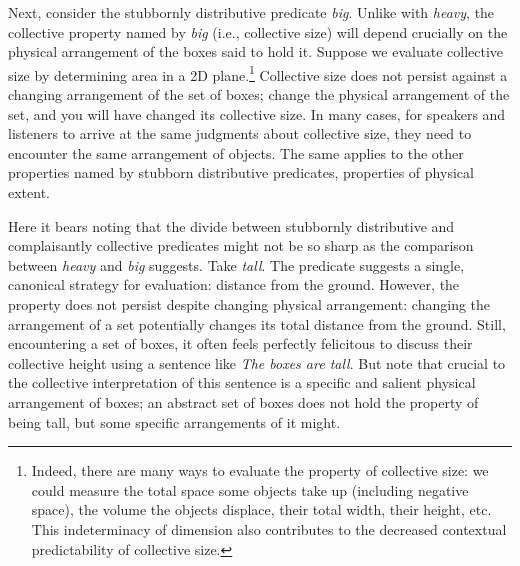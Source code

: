 \documentclass[linguex]{sp}
\begin{document}
Next, consider the stubbornly distributive predicate \emph{big}. Unlike with \emph{heavy}, the collective property named by \emph{big} (i.e., collective size) will depend crucially on the physical arrangement of the boxes said to hold it. Suppose we evaluate collective size by determining area in a 2D plane.\footnote{Indeed, there are many ways to evaluate the property of collective size: we could measure the total space some objects take up (including negative space), the volume the objects displace, their total width, their height, etc. This indeterminacy of dimension also contributes to the decreased contextual predictability of collective size.} Collective size does not persist against a changing arrangement of the set of boxes; change the physical arrangement of the set, and you will have changed its collective size. In many cases, for speakers and listeners to arrive at the same judgments about collective size, they need to encounter the same arrangement of objects. The same applies to the other properties named by stubborn distributive predicates, properties of physical extent.

Here it bears noting that the divide between stubbornly distributive and complaisantly collective predicates might not be so sharp as the comparison between \emph{heavy} and \emph{big} suggests. Take \emph{tall}. The predicate suggests a single, canonical strategy for evaluation: distance from the ground. However, the property does not persist despite changing physical arrangement: changing the arrangement of a set potentially changes its total distance from the ground. Still, encountering a set of boxes, it often feels perfectly felicitous to discuss their collective height using a sentence like \emph{The boxes are tall}. But note that crucial to the collective interpretation of this sentence is a specific and salient physical arrangement of boxes; an abstract set of boxes does not hold the property of being tall, but some specific arrangements of it might.
\end{document}
